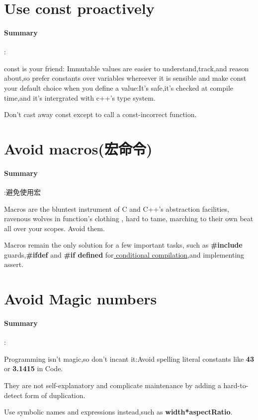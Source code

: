 \documentclass[UTF8,a4paper,12pt]{ctexbook}
\begin{document}
	\section{Use const proactively}   
		\paragraph{Summary}:
		  
			const is your friend: Immutable values are easier to understand,track,and reason about,so prefer constants over variables whereever it is sensible and make const your default choice when you define a value:It's safe,it's checked at compile time,and it's intergrated with c++'s type system.
			
			Don't cast away const except to call a const-incorrect function.
			 
	\section{Avoid macros(宏命令)}
		\paragraph{Summary}:避免使用宏
		
			Macros are the bluntest instrument of C and C++'s abstraction facilities, ravenous wolves in function's clothing , hard to tame, marching to their own beat all over your scopes. Avoid them.
			
			Macros remain the only solution for a few important tasks, such as \textbf{\#include} guards,\textbf{\#ifdef} and \textbf{\#if defined} for\underline{ conditional compilation},and implementing assert.
		
	\section{Avoid Magic numbers}
		\paragraph{Summary}:
		
			Programming isn't magic,so don't incant it:Avoid spelling literal constants like \textbf{43} or \textbf{3.1415} in Code.
			
			They are not self-explanatory and complicate maintenance by adding a hard-to-detect form of duplication.
			
			Use symbolic names and expressions instead,such as \textbf{width*aspectRatio}.
			
\end{document}
